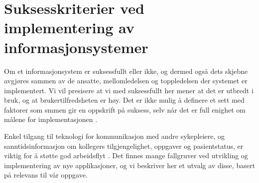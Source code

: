 \section{Suksesskriterier ved implementering av informasjonsystemer}
\label{chp: suksesskriterier}

Om et informasjonsystem er suksessfullt eller ikke, og dermed også dets skjebne avgjøres sammen av de ansatte, mellomledelsen og toppledelsen der systemet er implementert. Vi vil presisere at  vi med suksessfullt her mener at det er utbredt i bruk, og at brukertilfredsheten er høy. Det er ikke mulig å definere et sett med faktorer som smmen gir en oppskrift på suksess, selv når det er full enighet om målene for implementasjonen \cite{Berg01}.

\noindent
Enkel tilgang til teknologi for kommunikasjon med andre sykepleiere, og sanntidsinformasjon om kollegers tilgjengelighet, oppgaver og pasientstatus, er viktig for å støtte god arbeidsflyt \cite{Ebright10}. 
Det finnes  mange fallgruver ved utvikling og implementering av nye applikasjoner, og vi beskriver her et utvalg av disse, basert på relevans til vår oppgave.


